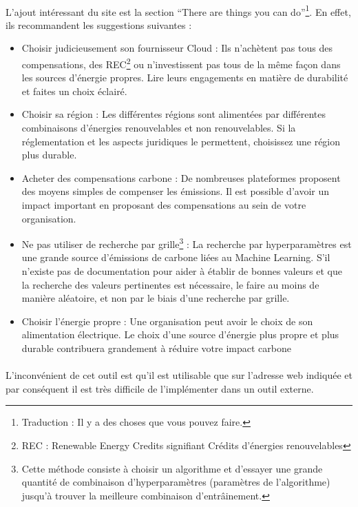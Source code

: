 \documentclass[10pt, french, a4paper]{report}
\begin{document}
\paragraph{}
L'ajout intéressant du site est la section ``There are things you can do''\footnote{Traduction : Il y a des choses que vous pouvez faire.}. En effet, ils recommandent les suggestions suivantes : 
\begin{itemize}
  \item Choisir judicieusement son fournisseur Cloud : Ils n'achètent pas tous des compensations, des REC\footnote{REC : Renewable Energy Credits signifiant Crédits d'énergies renouvelables} ou n'investissent pas tous de la même façon dans les sources d'énergie propres. Lire leurs engagements en matière de durabilité et faites un choix éclairé.
  \item Choisir sa région : Les différentes régions sont alimentées par différentes combinaisons d'énergies renouvelables et non renouvelables. Si la réglementation et les aspects juridiques le permettent, choisissez une région plus durable.
  \item Acheter des compensations carbone : De nombreuses plateformes proposent des moyens simples de compenser les émissions. Il est possible d'avoir un impact important en proposant des compensations au sein de votre organisation. 
  \item Ne pas utiliser de recherche par grille\footnote{Cette méthode consiste à choisir un algorithme et d'essayer une grande quantité de combinaison d'hyperparamètres (paramètres de l'algorithme) jusqu'à trouver la meilleure combinaison d'entrâinement.} : La recherche par hyperparamètres est une grande source d'émissions de carbone liées au Machine Learning. S'il n'existe pas de documentation pour aider à établir de bonnes valeurs et que la recherche des valeurs pertinentes est nécessaire, le faire au moins de manière aléatoire, et non par le biais d'une recherche par grille.
  \item Choisir l'énergie propre : Une organisation peut avoir le choix de son alimentation électrique. Le choix d'une source d'énergie plus propre et plus durable contribuera grandement à réduire votre impact carbone
\end{itemize}

\paragraph{}
L'inconvénient de cet outil est qu'il est utilisable que sur l'adresse web indiquée et par conséquent il est très difficile de l'implémenter dans un outil externe.
\end{document}
